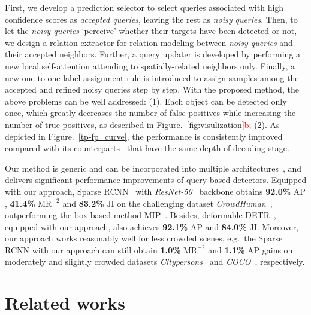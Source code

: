 \documentclass[final]{cvpr}
\begin{document}
First, we develop a prediction selector to select queries associated with high confidence scores as \emph{accepted queries}, leaving the rest as \emph{noisy queries}. Then, to let the \emph{noisy queries} `perceive' whether their targets have been detected or not, we design a relation extractor for relation modeling between \emph{noisy queries} and their accepted neighbors. Further, a query updater is developed by performing a new local self-attention attending to spatially-related neighbors only. Finally, a new one-to-one label assignment rule is introduced to assign samples among the accepted and refined noisy queries step by step. With the proposed method, the above problems can be well addressed: (1). Each object can be detected only once, which greatly decreases the number of false positives while increasing the number of true positives, as described in Figure.~\ref{fig:visulization}\textcolor{red}{b}; (2). As depicted in Figure.~\ref{tp-fp_curve}, the performance is consistently improved compared with its counterparts~\cite{sun2020sparse,zhu2021deformable} that have the same depth of decoding stage. 






Our method is generic and can be incorporated into multiple architectures~\cite{sun2020sparse, zhu2021deformable}, and delivers significant performance improvements of query-based detectors. Equipped with our approach, Sparse RCNN~\cite{sun2020sparse} with \emph{ResNet-50}~\cite{he2016deep} backbone obtains \textbf{92.0\%} $\text{AP}$, \textbf{41.4\%} $\text{MR}^{-2}$ and \textbf{83.2\%} $\text{JI}$ on the challenging dataset \emph{CrowdHuman}~\cite{shao2018crowdhuman}, outperforming the box-based method MIP~\cite{chu2020detection}. Besides, deformable DETR~\cite{zhu2021deformable}, equipped with our approach, also achieves \textbf{92.1\%} $\text{AP}$ and \textbf{84.0\%} $\text{JI}$. Moreover, our approach works reasonably well for less crowded scenes, e.g.\ the Sparse RCNN with our approach can still obtain \textbf{1.0\%} $\text{MR}^{-2}$ and \textbf{1.1\%} AP gains on moderately and slightly crowded datasets \emph{Citypersons}~\cite{zhang2017citypersons} and \emph{COCO}~\cite{lin2014microsoft}, respectively.

\vspace{-0.2cm}
\section{Related works}

\vspace{-0.2cm}
\end{document}
